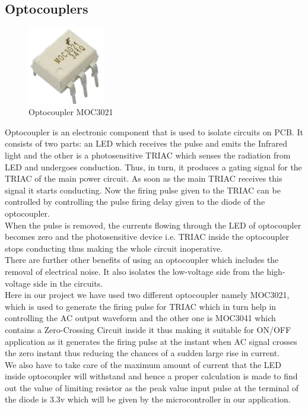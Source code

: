 \subsection{Optocouplers}
\begin{figure}
	\includegraphics[width=0.3\textwidth]{photos/theory/moc3021.jpg}
	\caption{Optocoupler MOC3021}
\end{figure}
Optocoupler is an electronic component that is used to isolate circuits on PCB. It consists of two parts: an LED which receives the pulse and emits the Infrared light and the other is a photosensitive TRIAC which senses the radiation from LED and undergoes conduction. Thus, in turn, it produces a gating signal for the TRIAC of the main power circuit. As soon as the main TRIAC receives this signal it starts conducting. Now the firing pulse given to the TRIAC can be controlled by controlling the pulse firing delay given to the diode of the optocoupler.\\
When the pulse is removed, the currents flowing through the LED of optocoupler becomes zero and the photosensitive device i.e. TRIAC inside the optocoupler stops conducting thus making the whole circuit inoperative. \\
There are further other benefits of using an optocoupler which includes the removal of electrical noise. It also isolates the low-voltage side from the high-voltage side in the circuits.\\
Here in our project we have used two different optocoupler namely MOC3021, which is used to generate the firing pulse for TRIAC which in turn help in controlling the AC output waveform and the other one is MOC3041 which contains a Zero-Crossing Circuit inside it thus making it suitable for ON/OFF application as it generates the firing pulse at the instant when AC signal crosses the zero instant thus reducing the chances of a sudden large rise in current. \\
We also have to take care of the maximum amount of current that the LED inside optocoupler will withstand and hence a proper calculation is made to find out the value of limiting resistor as the peak value input pulse at the terminal of the diode is 3.3v which will be given by the microcontroller in our application.  \\

